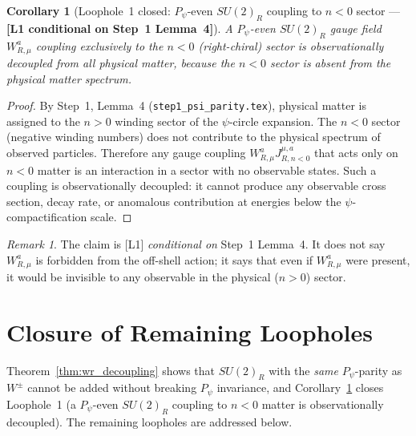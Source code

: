 \documentclass[12pt,a4paper]{article}
\newtheorem{corollary}[theorem]{Corollary}
\theoremstyle{definition}
\theoremstyle{remark}
\newtheorem{remark}[theorem]{Remark}
\begin{document}
\begin{corollary}[Loophole~1 closed: $P_\psi$-even $SU(2)_R$ coupling to $n<0$ sector — \textbf{[L1 conditional on Step~1 Lemma~4]}]
\label{cor:loophole1}
A $P_\psi$-even $SU(2)_R$ gauge field $W_{R,\mu}^a$ coupling exclusively to
the $n<0$ (right-chiral) sector is observationally decoupled from all physical matter,
because the $n<0$ sector is absent from the physical matter spectrum.
\end{corollary}

\begin{proof}
By Step~1, Lemma~4 (\texttt{step1\_psi\_parity.tex}), physical matter is
assigned to the $n>0$ winding sector of the $\psi$-circle expansion.
The $n<0$ sector (negative winding numbers) does not contribute to the
physical spectrum of observed particles.
Therefore any gauge coupling $W_{R,\mu}^a J^{\mu,a}_{R,n<0}$ that acts only on
$n<0$ matter is an interaction in a sector with no observable states.
Such a coupling is observationally decoupled: it cannot produce any observable
cross section, decay rate, or anomalous contribution at energies below the
$\psi$-compactification scale.
\end{proof}

\begin{remark}
  The claim is [L1] \emph{conditional on} Step~1 Lemma~4.
  It does not say $W_{R,\mu}^a$ is forbidden from the off-shell action;
  it says that even if $W_{R,\mu}^a$ were present, it would be invisible
  to any observable in the physical ($n>0$) sector.
\end{remark}

\section{Closure of Remaining Loopholes}
\label{sec:open}

Theorem~\ref{thm:wr_decoupling} shows that $SU(2)_R$ with the \emph{same}
$P_\psi$-parity as $W^\pm$ cannot be added without breaking $P_\psi$
invariance, and Corollary~\ref{cor:loophole1} closes Loophole~1
(a $P_\psi$-even $SU(2)_R$ coupling to $n<0$ matter is observationally decoupled).
The remaining loopholes are addressed below.
\end{document}
